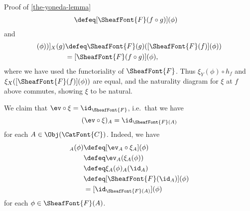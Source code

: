 \begin{Proof}{Proof of \cref{the-yoneda-lemma}}
\begin{align*}
                                          &\defeq [\SheafFont{F}(f\circ g)](\phi)
    \end{align*}
    and
    \begin{align*}
        [\xi_{X}([\SheafFont{F}(f)](\phi))]_{X}(g) &\defeq \SheafFont{F}(g)([\SheafFont{F}(f)](\phi))\\
                                                   &=      [\SheafFont{F}(f\circ g)](\phi),
    \end{align*}
    where we have used the functoriality of $\SheafFont{F}$. Thus $\xi_{Y}(\phi)\circ h_{f}$ and $\xi_{X}([\SheafFont{F}(f)](\phi))$ are equal, and the naturality diagram for $\xi$ at $f$ above commutes, showing $\xi$ to be natural.

    We claim that $\ev\circ\xi=\id_{\SheafFont{F}}$, i.e.\ that we have
    \[
        (\ev\circ\xi)_{A}%
        =%
        \id_{\SheafFont{F}(A)}%
    \]%
    for each $A\in\Obj(\CatFont{C})$. Indeed, we have
    \begin{align*}
        [\ev\circ\xi]_{A}(\phi) &\defeq [\ev_{A}\circ\xi_{A}](\phi)\\
                                &\defeq \ev_{A}(\xi_{A}(\phi))\\
                                &\defeq \xi_{A}(\phi)_{A}(\id_{A})\\
                                &\defeq [\SheafFont{F}(\id_{A})](\phi)\\
                                &=      [\id_{\SheafFont{F}(A)}](\phi)
    \end{align*}
    for each $\phi\in\SheafFont{F}(A)$.


\end{Proof}
